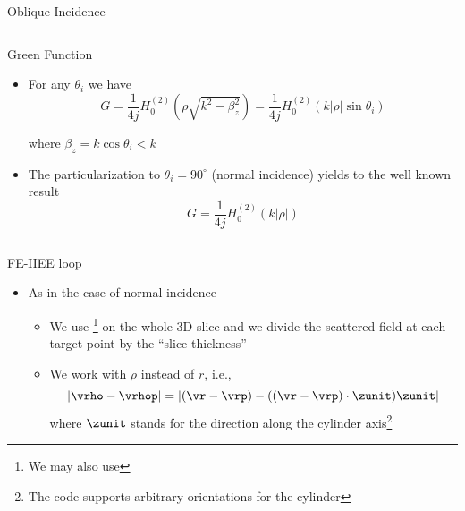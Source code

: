 \begin{frame}[allowframebreaks]{Oblique Incidence}
\begin{columns}
     \centering
    \begin{block}{Green Function}
      \begin{itemize}
      \item For any  $\theta_i$ we have
        \begin{equation*}
          G = \dfrac{1}{4j} H_0^{(2)}\left( \rho\sqrt{k^2-\beta_z^2}\right) 
          = \dfrac{1}{4j} H_0^{(2)}\left( k|\rho|\sin\theta_i\right)
        \end{equation*}
        
        
        where $\beta_z=k\cos\theta_i < k$
        
      \item The particularization to $\theta_i=90^\circ$ (normal
        incidence) yields to the well known result
        \begin{equation*}
          G = \dfrac{1}{4j} H_0^{(2)}(k|\rho|)
        \end{equation*}
        
      \end{itemize}
    \end{block}
  \end{columns}
  
    \framebreak %

    
    \begin{block}{FE-IIEE loop}
      \begin{itemize}
      \item As in the case of normal incidence
        \begin{itemize}
        \item We use {\GreenD}\footnote{We may also use {\GreenTEw}}
          on the whole 3D slice and we divide  the scattered field
          at each target point by the ``slice thickness''

        \item We work with $\rho$ instead of $r$, i.e.,
          \begin{equation*}
            |\vrho-\vrhop|=|(\vr-\vrp)-((\vr-\vrp)\cdot\zunit)\zunit|
          \end{equation*}
          where $\zunit$ stands for the direction along the cylinder
          axis\footnote{The code supports arbitrary orientations for the
            cylinder}
        \end{itemize}


\end{itemize}
\end{block}
\end{frame}
